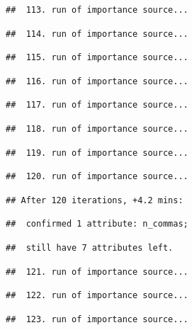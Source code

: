 \documentclass[
]{article}
\begin{document}
\begin{verbatim}
##  113. run of importance source...
\end{verbatim}

\begin{verbatim}
##  114. run of importance source...
\end{verbatim}

\begin{verbatim}
##  115. run of importance source...
\end{verbatim}

\begin{verbatim}
##  116. run of importance source...
\end{verbatim}

\begin{verbatim}
##  117. run of importance source...
\end{verbatim}

\begin{verbatim}
##  118. run of importance source...
\end{verbatim}

\begin{verbatim}
##  119. run of importance source...
\end{verbatim}

\begin{verbatim}
##  120. run of importance source...
\end{verbatim}

\begin{verbatim}
## After 120 iterations, +4.2 mins:
\end{verbatim}

\begin{verbatim}
##  confirmed 1 attribute: n_commas;
\end{verbatim}

\begin{verbatim}
##  still have 7 attributes left.
\end{verbatim}

\begin{verbatim}
##  121. run of importance source...
\end{verbatim}

\begin{verbatim}
##  122. run of importance source...
\end{verbatim}

\begin{verbatim}
##  123. run of importance source...
\end{verbatim}
\end{document}
